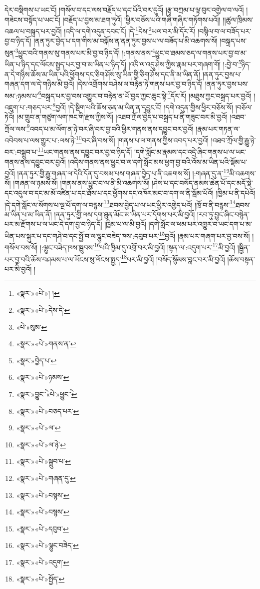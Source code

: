 དེར་བསྡིགས་པ་ཡང་ངོ། །གསོལ་བ་དང་ལས་བརྗོད་པ་དང་པོའི་བར་དུའོ། །རྩྭ་བཀྲམ་པ་ལྟ་བུར་འགྱེལ་བ་ལའོ། །གཟེངས་བསྟོད་པ་ཡང་ངོ། །བརྗོད་པ་བྱས་མ་ཐག་ཏུའོ། །ཕྱིར་བཅོས་པའི་གཞི་གཞིར་གཏོགས་པའོ།། །།ཚུལ་ཁྲིམས་འཆལ་པ་བསྐྲད་པར་བྱའོ། །འདི་ལ་དགེ་འདུན་དབང་ངོ། །དེ་\footnote{«སྣར་»«པེ་»། །}དེས་\footnote{«སྣར་»«པེ་»དེས་དེ་}ཡལ་བར་མི་དོར་རོ། །བསྙིལ་བ་ལ་བཟོད་པར་བྱ་བ་ཉིད་དོ། །ནན་ཏུར་བྱེད་པ་དག་གིས་མ་བསྐོས་ན་ནན་ཏུར་བྱས་པ་ལ་བཟོད་པ་མི་འཆགས་སོ། །བསྐྲད་པས་སུན་\footnote{«པེ་»སུམ་}ཕྱུང་བའི་གནས་སུ་གནས་པར་མི་བྱ་བ་ཉིད་དོ། །:གནས་ནས་\footnote{«སྣར་»«པེ་»གནས་ན་}ཕྱུང་བ་ཐམས་ཅད་ལ་གནས་པར་བྱ་བ་མ་ཡིན་པ་ཉིད་དང་ལོངས་སྤྱད་པར་བྱ་བ་མ་ཡིན་པ་ཉིད་དོ། །འདི་ལ་འདུ་ཤེས་ཀྱིས་རྣམ་པར་གཞག་གོ། །:བྱེ་བ་\footnote{«སྣར་»བྱེད་པ་}ཉིད་ན་དེ་གཉིས་ཆོས་མ་ཡིན་པའི་ཕྱོགས་དང་ཅིག་ཤོས་སུ་ཡིན་གྱི་ཅིག་ཤོས་དང་ནི་མ་ཡིན་ནོ། །ནན་ཏུར་བྱས་པ་གཞན་དག་ལ་དེ་གཉིས་མི་བྱའོ། །དེས་འགྲོགས་བཤེས་ལ་བརྟེན་ཏེ་གནས་པར་བྱ་བ་ཉིད་དོ། །ནན་ཏུར་བྱས་པས་སམ་:ཉམས་པ་\footnote{«སྣར་»«པེ་»ཉམས་}བསྐྲད་པར་བྱ་བས་འགྱུར་བ་བརྟེན་ན་ཡོ་བྱད་ཀྱང་ཆུང་སྟེ་\footnote{«སྣར་»བྱུང་ེ་«པེ་»ཕྱུང་ེ་}དོར་རོ། །མཐུས་ཀྱང་བསྐྲད་པར་བྱའོ། །འཇུག་པ་:གཅད་པར་\footnote{«སྣར་»«པེ་»བཅད་པར་}བྱའོ། །དེ་སྡིག་པའི་ཆོས་ཅན་མ་ཡིན་ན་དབྱུང་ངོ། །དགེ་འདུན་གྱིས་ཕྱིར་བཅོས་སོ། །བཅོལ་ཏེའོ། །མ་གྲུབ་ན་གཙུག་ལག་ཁང་གི་རྫས་ཀྱིས་སོ། །འཐབ་ཀྲོལ་བྱེད་པ་བསྐྲད་པ་ནི་གཟུང་བར་མི་བྱའོ། །འཐབ་ཀྲོལ་ལས་\footnote{«སྣར་»«པེ་»ལ་}འབད་པ་མ་ལོག་ན་ཉེ་བར་ཞི་བར་བྱ་བའི་ཕྱིར་གནས་ནས་དབྱུང་བར་བྱའོ། །རྣམ་པར་གཏན་ལ་འབེབས་པ་ལས་གྱུར་པ་:ལས་ཉེ་\footnote{«སྣར་»«པེ་»ལ་ཉེ་}བར་ཞི་བས་སོ། །གནས་པ་ལ་གནས་ཀྱིས་འབད་པར་བྱའོ། །འཐབ་ཀྲོལ་གྱི་རྒྱུ་ཉེ་བར་:བསྒྲུབ་པ་\footnote{«སྣར་»«པེ་»སྒྲུབ་པ་}ཡང་གནས་ནས་དབྱུང་བར་བྱ་བ་ཉིད་དོ། །དགེ་སློང་མ་རྣམས་དང་འདྲེ་ཞིང་གནས་པ་ལ་ཡང་གནས་ནས་དབྱུང་བར་བྱའོ། །འདིས་གནས་ནས་ཕྱུང་བ་ལ་དགེ་སློང་མས་ཕྱག་བྱ་བའི་འོས་མ་ཡིན་པའི་སྡོམ་པ་བྱའོ། །ནན་ཏུར་གྱི་རྒྱུ་གཞན་ལ་དེའི་དོན་དུ་བསམ་པས་གཞན་བྱེད་པ་ནི་འཆགས་སོ། །:གཞན་དུ་ན་\footnote{«སྣར་»«པེ་»གཞན་དུ་}མི་འཆགས་སོ། །གཞན་ལ་ཉམས་སོ། །གནས་ནས་ཕྱུང་བ་ལ་ནི་མི་འཆགས་སོ། །ཤེས་པ་དང་བསོད་ནམས་ཆེན་པོ་དང་མདོ་སྡེ་དང་འདུལ་བ་དང་མ་མོ་འཛིན་པ་དང་ཐོས་པ་དང་ཕྱོགས་དང་འཁོར་མང་བ་དག་ལ་ནི་སྦོམ་པོའོ། །ཁྱིམ་པ་ནི་དཔེའོ། །དེ་དགེ་སློང་ལ་སོགས་པ་ལྔ་པོ་དག་ལ་བརྙས་\footnote{«སྣར་»«པེ་»བསྙས་}ཐབས་བྱེད་པ་ལ་ཡང་ཕྱིར་འགྱེད་པའོ། །ཁྲོ་བ་ནི་བརྙས་\footnote{«སྣར་»«པེ་»བསྙས་}ཐབས་མ་ཡིན་པ་མ་ཡིན་ནོ། །ནན་ཏུར་གྱི་ལས་དག་ཐུན་མོང་མ་ཡིན་པར་དོགས་པར་མི་བྱའོ། །རབ་ཏུ་བྱུང་ཞིང་བསྙེན་པར་མ་རྫོགས་པ་ལ་ཡང་དེ་དག་བྱ་བ་ཉིད་དོ། །ཁྱིམ་པ་ལ་མི་བྱའོ། །དགེ་སློང་ལ་ཕམ་པར་འགྱུར་བ་ཡང་དག་པ་མ་ཡིན་པས་སྐུར་པ་དང་གཤེ་བ་དང་སྤྱོ་བ་ལ་ལྷུང་བཟེད་ཁས་:དབུབ་པར་\footnote{«སྣར་»«པེ་»དབུབ་}བྱའོ། །རྣམ་པར་གཞག་པར་བྱ་བས་སོ། །གསོལ་བས་སོ། །:ལྷུང་བཟེད་ཁས་སྦུབས་\footnote{«སྣར་»«པེ་»ལྷུང་བཟེད་}པའི་ཁྱིམ་དུ་འགྲོ་བར་མི་བྱའོ། །སྟན་ལ་:འདུག་པར་\footnote{«སྣར་»«པེ་»འདུག་}མི་བྱའོ། །སྦྱིན་པར་བྱ་བའི་ཆོས་བཤམས་པ་ལ་ཡོངས་སུ་ལོངས་སྤྱད་\footnote{«སྣར་»«པེ་»སྤྱོད་}པར་མི་བྱའོ། །བསོད་སྙོམས་བླང་བར་མི་བྱའོ། །ཆོས་བསྟན་པར་མི་བྱའོ། །

